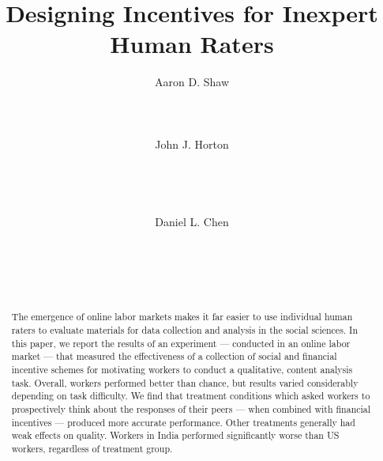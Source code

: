 \documentclass{cscw2010}
\begin{document}
\setlength{\paperheight}{11in}
\setlength{\paperwidth}{8.5in}
\setlength{\pdfpageheight}{\paperheight}
\setlength{\pdfpagewidth}{\paperwidth}


\title{Designing Incentives for Inexpert Human Raters} 



\author{
\alignauthor 
Aaron D. Shaw\\
       \\
       \\
       \\
\alignauthor 
John J. Horton\\
       \\
       \\
       \\
       \\
\alignauthor 
Daniel L. Chen\\
       \\
       \\
       \\
       \\
}

\maketitle

\begin{abstract} 
The emergence of online labor markets makes it far easier to use
individual human raters to evaluate materials for data collection and
analysis in the social sciences. In this paper, we report the results
of an experiment --- conducted in an online labor market --- that measured
the effectiveness of a collection of social and financial incentive
schemes for motivating workers to conduct a qualitative, content
analysis task. Overall, workers performed better than chance, but
results varied considerably depending on task difficulty. We find that
treatment conditions which asked workers to prospectively think about
the responses of their peers --- when combined with financial
incentives --- produced more accurate performance. Other
treatments generally had weak effects on quality. Workers in India
performed significantly worse than US workers, regardless of treatment
group.
\end{abstract}
\end{document}
